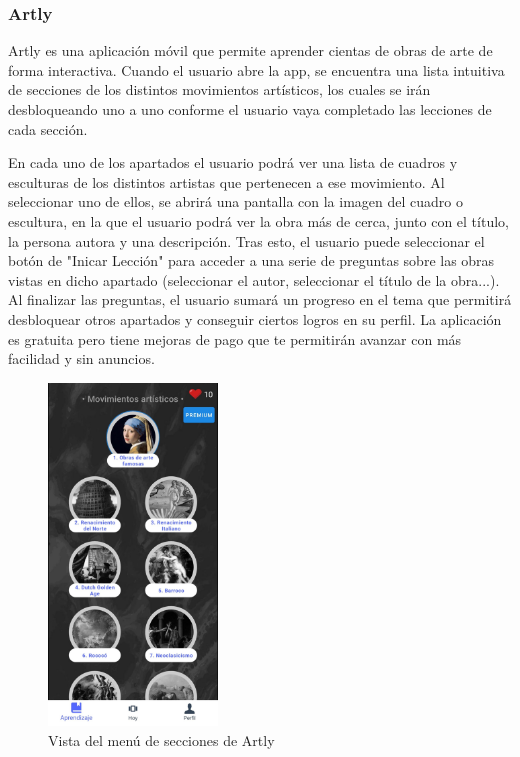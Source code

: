     \subsubsection{Artly}
    Artly es una aplicación móvil que permite aprender cientas de obras de arte de forma interactiva. Cuando el usuario abre la app, 
    se encuentra una lista intuitiva de secciones de los distintos movimientos artísticos, los cuales se irán desbloqueando uno a uno
    conforme el usuario vaya completado las lecciones de cada sección. 

    En cada uno de los apartados el usuario podrá ver una lista de cuadros y esculturas de los distintos artistas que pertenecen a ese movimiento.
    Al seleccionar uno de ellos, se abrirá una pantalla con la imagen del cuadro o escultura, en la que el usuario podrá ver la obra más de cerca, junto
    con el título, la persona autora y una descripción. 
    Tras esto, el usuario puede seleccionar el botón de "Inicar Lección" para acceder a una serie de preguntas sobre las obras vistas en dicho apartado (seleccionar el autor, seleccionar el título de la obra...). 
    Al finalizar las preguntas, el usuario sumará un progreso en el tema que permitirá desbloquear otros apartados y conseguir ciertos logros en su perfil.
    La aplicación es gratuita pero tiene mejoras de pago que te permitirán avanzar con más facilidad y sin anuncios.

    \begin{figure}[H]

        \centering
        \includegraphics[width=0.4\textwidth]{imagenes/c2/artly.jpeg}
        \caption{Vista del menú de secciones de Artly}
    \end{figure}


